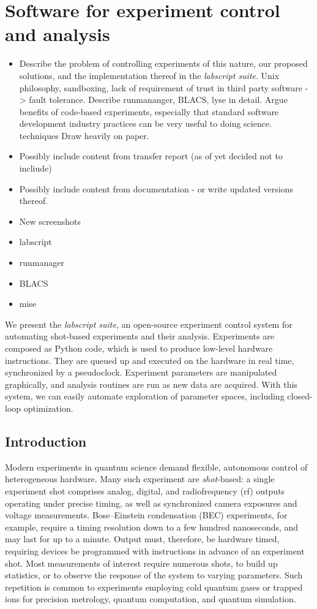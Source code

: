 \chapter{Software for experiment control and analysis}

\begin{itemize}
\item Describe the problem of controlling experiments of this nature, our proposed solutions, and the implementation thereof in the \emph{labscript suite}. Unix philosophy, sandboxing, lack of requirement of trust in third party software -> fault tolerance. Describe runmananger, BLACS, lyse in detail. Argue benefits of code-based experiments, especially that standard software development industry practices can be very useful to doing science. techniques Draw heavily on paper.
\item Possibly include content from transfer report (as of yet decided not to incliude)
\item Possibly include content from documentation - or write updated versions thereof.
\item New screenshots
\item{labscript}
\item{runmanager}
\item{BLACS}
\item{mise}
\end{itemize}

We present the \textit{labscript suite}, an open-source experiment control system for automating shot-based experiments and their analysis.
Experiments are composed as Python code, which is used to produce low-level hardware instructions.
They are queued up and executed on the hardware in real time, synchronized by a pseudoclock.
Experiment parameters are manipulated graphically, and analysis routines are run as new data are acquired.
With this system, we can easily automate exploration of parameter spaces, including closed-loop optimization.


\section{Introduction}
Modern experiments in quantum science demand flexible, autonomous control of heterogeneous hardware.
Many such experiment are \textit{shot}-based: a single experiment shot comprises analog, digital, and radiofrequency (rf) outputs operating under precise timing, as well as synchronized camera exposures and voltage measurements.
Bose--Einstein condensation (BEC) experiments\cite{weidemuller_cold_2009}, for example, require a timing resolution down to a few hundred nanoseconds, and may last for up to a minute.
Output must, therefore, be hardware timed, requiring devices be programmed with instructions in advance of an experiment shot.
Most measurements of interest require numerous shots, to build up statistics, or to observe the response of the system to varying parameters.
Such repetition is common to experiments employing cold quantum gases or trapped ions for precision metrology\cite{robins_atom_2013, cronin_optics_2009}, quantum computation\cite{negretti_quantum_2011, ladd_quantum_2010}, and quantum simulation\cite{bloch_quantum_2012,blatt_quantum_2012}.

